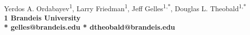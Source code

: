 \documentclass[10pt,letterpaper]{article}
\begin{document}
\vspace*{0.35in}

\begin{flushleft}
{\Large
\textbf{}
\textbf{}
}
\newline
\\
Yerdos A. Ordabayev\textsuperscript{1},
Larry Friedman\textsuperscript{1},
Jeff Gelles\textsuperscript{1,*},
Douglas L. Theobald\textsuperscript{1,*}
\\
\bigskip
\bf{1} Brandeis University
\\
\bigskip
* gelles@brandeis.edu
* dtheobald@brandeis.edu


\end{flushleft}
\end{document}
